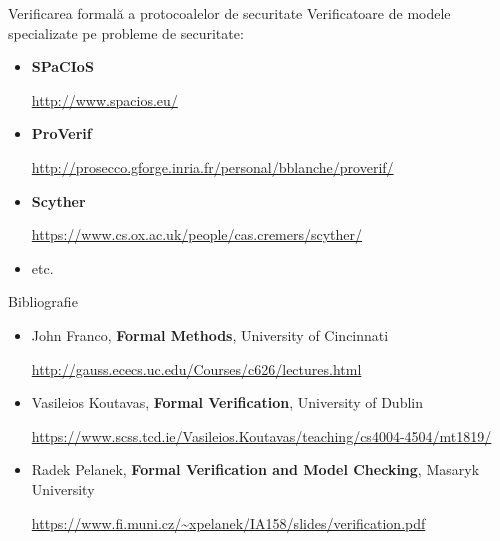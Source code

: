 \documentclass{beamer}
\begin{document}
\begin{frame}{Verificarea formală a protocoalelor de securitate}
Verificatoare de modele specializate pe probleme de securitate:
\begin{itemize}
\item
\textbf{SPaCIoS} 

\url{http://www.spacios.eu/}
\newline

\item
\textbf{ProVerif}

\url{http://prosecco.gforge.inria.fr/personal/bblanche/proverif/}
\newline

\item
\textbf{Scyther}

\url{https://www.cs.ox.ac.uk/people/cas.cremers/scyther/}
\newline

\item
etc.
\end{itemize}
\end{frame}



\begin{frame}{Bibliografie}
\begin{itemize}
\item
John Franco, \textbf{Formal Methods}, University of Cincinnati

\url{http://gauss.ececs.uc.edu/Courses/c626/lectures.html}
\newline

\item
Vasileios Koutavas, \textbf{Formal Verification}, University of Dublin

\url{https://www.scss.tcd.ie/Vasileios.Koutavas/teaching/cs4004-4504/mt1819/}
\newline

\item
Radek Pelanek, \textbf{Formal Verification and Model Checking}, Masaryk University

\url{https://www.fi.muni.cz/~xpelanek/IA158/slides/verification.pdf}
\end{itemize}
\end{frame}
\end{document}
